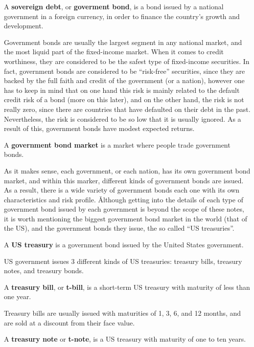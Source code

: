 A \textbf{sovereign debt}, or \textbf{goverment bond}, is a bond issued by a national government in a foreign currency,
in order to finance the country's growth and development.
\ed

Government bonds are usually the largest segment in any national market, and the most liquid part of the fixed-income
market. When it comes to credit worthiness, they are considered to be the safest type of fixed-income securities. In
fact, government bonds are considered to be ``risk-free'' securities, since they are backed by the full faith and
credit of the government (or a nation), however one has to keep in mind that on one hand this risk is mainly related to
the default credit risk of a bond (more on this later), and on the other hand, the risk is not really zero, since there
are countries that have defaulted on their debt in the past. Nevertheless, the risk is considered to be so low that it
is usually ignored. As a result of this, government bonds have modest expected returns.

A \textbf{government bond market} is a market where people trade government bonds.
\ed

As it makes sense, each government, or each nation, has its own government bond market, and within this marker,
different kinds of government bonds are issued. As a result, there is a wide variety of government bonds each one
with its own characteristics and risk profile. \v

Although getting into the details of each type of government bond issued by each government is beyond the scope of
these notes, it is worth mentioning the biggest government bond market in the world (that of the US), and the
government bonds they issue, the so called ``US treasuries''.

\bd[US Treasury]
A \textbf{US treasury} is a government bond issued by the United States government.
\ed

US government issues 3 different kinds of US treasuries: treasury bills, treasury notes, and treasury bonds.

A \textbf{treasury bill}, or \textbf{t-bill}, is a short-term US treasury with maturity of less than one year.
\ed

Treasury bills are usually issued with maturities of 1, 3, 6, and 12 months, and are sold at a discount from their face
value.

A \textbf{treasury note} or \textbf{t-note}, is a US treasury with maturity of one to ten years.
\ed

